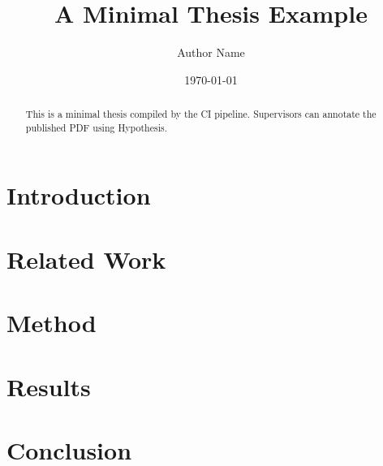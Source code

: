 \documentclass[12pt]{report}
\title{A Minimal Thesis Example}
\author{Author Name}
\date{\today}
\begin{document}
\maketitle
\begin{abstract}
This is a minimal thesis compiled by the CI pipeline. Supervisors can annotate the published PDF using Hypothesis.
\end{abstract}

\tableofcontents

\chapter{Introduction}
\lipsum[1-3]

\chapter{Related Work}
\lipsum[4-6]

\chapter{Method}
\lipsum[7-9]

\chapter{Results}
\lipsum[10-12]

\chapter{Conclusion}
\lipsum[13-14]



\end{document}
